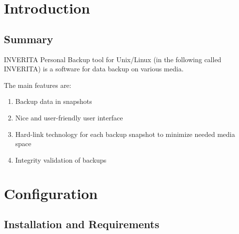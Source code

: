 %
%
%
%


\chapter{Introduction}

\section{Summary}
INVERITA Personal Backup tool for Unix/Linux (in the following called INVERITA)
is a software for data backup on various media.

The main features are:
\begin{enumerate}
  \item Backup data in snapshots
  \item Nice and user-friendly user interface
  \item Hard-link technology for each backup snapshot to minimize needed media space
  \item Integrity validation of backups
\end{enumerate}


\chapter{Configuration}



\section{Installation and Requirements}


